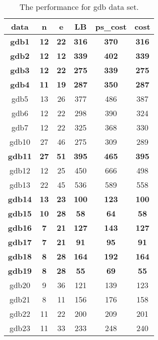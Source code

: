 \documentclass[conference,compsoc]{IEEEtran}
\begin{document}
\begin{appendix}
\begin{table}[htbp]
\begin{center}
\begin{tabular}{@{}cccccc@{}}
\toprule
data           & n           & e           & LB           & ps\_cost     & cost         \\ \midrule
\textbf{gdb1}  & \textbf{12} & \textbf{22} & \textbf{316} & \textbf{370} & \textbf{316} \\
\textbf{gdb2}  & \textbf{12} & \textbf{12} & \textbf{339} & \textbf{402} & \textbf{339} \\
\textbf{gdb3}  & \textbf{12} & \textbf{22} & \textbf{275} & \textbf{339} & \textbf{275} \\
\textbf{gdb4}  & \textbf{11} & \textbf{19} & \textbf{287} & \textbf{350} & \textbf{287} \\
gdb5           & 13          & 26          & 377          & 486          & 387          \\
gdb6           & 12          & 22          & 298          & 390          & 324          \\
gdb7           & 12          & 22          & 325          & 368          & 330          \\
gdb10          & 27          & 46          & 275          & 309          & 289          \\
\textbf{gdb11} & \textbf{27} & \textbf{51} & \textbf{395} & \textbf{465} & \textbf{395} \\
gdb12          & 12          & 25          & 450          & 666          & 498          \\
gdb13          & 22          & 45          & 536          & 589          & 558          \\
\textbf{gdb14} & \textbf{13} & \textbf{23} & \textbf{100} & \textbf{123} & \textbf{100} \\
\textbf{gdb15} & \textbf{10} & \textbf{28} & \textbf{58}  & \textbf{64}  & \textbf{58}  \\
\textbf{gdb16} & \textbf{7}  & \textbf{21} & \textbf{127} & \textbf{143} & \textbf{127} \\
\textbf{gdb17} & \textbf{7}  & \textbf{21} & \textbf{91}  & \textbf{95}  & \textbf{91}  \\
\textbf{gdb18} & \textbf{8}  & \textbf{28} & \textbf{164} & \textbf{192} & \textbf{164} \\
\textbf{gdb19} & \textbf{8}  & \textbf{28} & \textbf{55}  & \textbf{69}  & \textbf{55}  \\
gdb20          & 9           & 36          & 121          & 139          & 123          \\
gdb21          & 8           & 11          & 156          & 176          & 158          \\
gdb22          & 11          & 22          & 200          & 209          & 201          \\
gdb23          & 11          & 33          & 233          & 248          & 240          \\ \bottomrule
\end{tabular}
\caption{The performance for gdb data set.}
\end{center}
\end{table}


\end{appendix}
\end{document}
